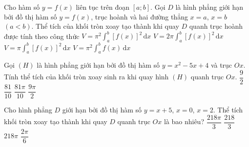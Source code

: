 \begin{ex}%
	Cho hàm số $y=f(x)$ liên tục trên đoạn $[a;b]$. Gọi $D$ là hình phẳng  giới hạn bởi đồ thị hàm số $y=f(x)$, trục hoành và hai đường thẳng $x=a$, $x=b$ $(a<b)$. Thể tích của khối tròn xoay tạo thành khi quay $D$ quanh trục hoành được tính theo công thức
	\choice 
		{$V=\pi^2\displaystyle\int_a^b [f(x)]^2\mathrm{\,d}x$} 
		{$V=2\pi\displaystyle\int_a^b  [f(x)]^2\mathrm{\,d}x$}
		{\True  $V=\pi\displaystyle\int_a^b [f(x)]^2\mathrm{\,d}x$}
		 {$V=\pi^2\displaystyle\int_a^b f(x)\mathrm{\,d}x$}
\end{ex}

\begin{ex}%
	Gọi $(H)$ là hình phẳng giới hạn bởi đồ thị hàm số $y=x^2-5x+4$ và trục $Ox$. Tính thể tích của khối tròn xoay sinh ra khi quay hình  $(H)$ quanh trục $Ox$.
	\choice 
		{$\dfrac{9}{2}$} 
		{$\dfrac{81}{10}$} 
		{\True $\dfrac{81\pi}{10}$} 
		 {$\dfrac{9\pi}{2}$}
\end{ex}

\begin{ex}%
	Cho hình phẳng $D$ giới hạn bởi đồ thị hàm số $y = x + 5$, $x = 0$, $x = 2$. Thể tích khối tròn xoay tạo thành khi quay $D$ quanh trục  $Ox$ là bao nhiêu?
	\choice 
		{\True  $\dfrac{218\pi}{3}$}
		 {$\dfrac{218}{3}$}
		{$218\pi$} 
		{$\dfrac{2\pi}{6}$} 
\end{ex}

